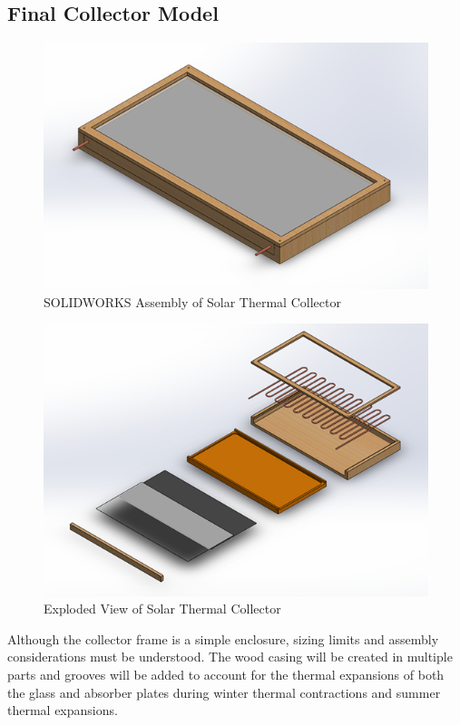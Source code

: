 \subsection{Final Collector Model}

\begin{figure}[H]
    \centering
    \includegraphics[width=\textwidth]{images/collector_assembly.png}
    \caption{SOLIDWORKS Assembly of Solar Thermal Collector}
\end{figure}

\begin{figure}[H]
    \centering
    \includegraphics[width=\textwidth]{images/collector_assembly_exploded.png}
    \caption{Exploded View of Solar Thermal Collector}
\end{figure}

\medskip
Although the collector frame is a simple enclosure, sizing limits and assembly considerations must be understood. The wood casing will be created in multiple parts and grooves will be added to account for the thermal expansions of both the glass and absorber plates during winter thermal contractions and summer thermal expansions. 

